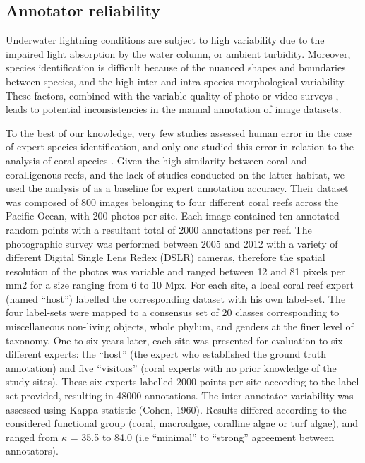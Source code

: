 \subsection{Annotator reliability}\label{chapitre1_2.1}
Underwater lightning conditions are subject to high variability due to the impaired light absorption by the water column, or ambient turbidity. Moreover, species identification is difficult because of the nuanced shapes and boundaries between species, and the high inter and intra-species morphological variability. These factors, combined with the variable quality of photo or video surveys \citep{manderson_robotic_2017}, leads to potential inconsistencies in the manual annotation of image datasets. 

To the best of our knowledge, very few studies assessed human error in the case of expert species identification, and only one studied this error in relation to the analysis of coral species \citep{beijbom_towards_2015}. Given the high similarity between coral and coralligenous reefs, and the lack of studies conducted on the latter habitat, we used the analysis of \citet{beijbom_towards_2015} as a baseline for expert annotation accuracy. Their dataset was composed of 800 images belonging to four different coral reefs across the Pacific Ocean, with 200 photos per site. Each image contained ten annotated random points with a resultant total of 2000 annotations per reef. The photographic survey was performed between 2005 and 2012 with a variety of different Digital Single Lens Reflex (DSLR) cameras, therefore the spatial resolution of the photos was variable and ranged between 12 and 81 pixels per mm2 for a size ranging from 6 to 10 Mpx. For each site, a local coral reef expert (named “host”) labelled the corresponding dataset with his own label-set. The four label-sets were mapped to a consensus set of 20 classes corresponding to miscellaneous non-living objects, whole phylum, and genders at the finer level of taxonomy. One to six years later, each site was presented for evaluation to six different experts: the “host” (the expert who established the ground truth annotation) and five “visitors” (coral experts with no prior knowledge of the study sites). These six experts labelled 2000 points per site according to the label set provided, resulting in 48000 annotations. The inter-annotator variability was assessed using Kappa statistic (Cohen, 1960). Results differed according to the considered functional group (coral, macroalgae, coralline algae or turf algae), and ranged from \(\kappa\) = 35.5 to 84.0 (i.e “minimal” to “strong” agreement between annotators). 

